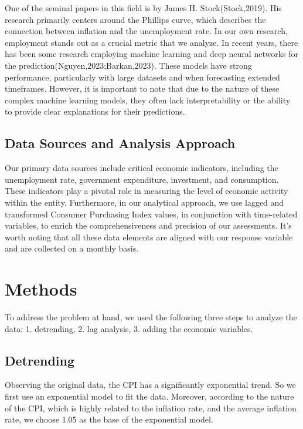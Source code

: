 \documentclass[
  man,floatsintext,
  man]{apa6}
\begin{document}
One of the seminal papers in this field is by James H. Stock(Stock,2019). His research primarily centers around the Phillips curve, which describes the connection between inflation and the unemployment rate. In our own research, employment stands out as a crucial metric that we analyze.
In recent years, there has been some research employing machine learning and deep neural networks for the prediction(Nguyen,2023;Barkan,2023). These models have strong performance, particularly with large datasets and when forecasting extended timeframes. However, it is important to note that due to the nature of these complex machine learning models, they often lack interpretability or the ability to provide clear explanations for their predictions.

\hypertarget{data-sources-and-analysis-approach}{%
\subsection{Data Sources and Analysis Approach}\label{data-sources-and-analysis-approach}}

Our primary data sources include critical economic indicators, including the unemployment rate, government expenditure, investment, and consumption. These indicators play a pivotal role in measuring the level of economic activity within the entity. Furthermore, in our analytical approach, we use lagged and transformed Consumer Purchasing Index values, in conjunction with time-related variables, to enrich the comprehensiveness and precision of our assessments. It's worth noting that all these data elements are aligned with our response variable and are collected on a monthly basis.

\hypertarget{methods}{%
\section{Methods}\label{methods}}

To address the problem at hand, we used the following three steps to analyze the data: 1. detrending, 2. lag analysis, 3. adding the economic variables.

\hypertarget{detrending}{%
\subsection{Detrending}\label{detrending}}

Observing the original data, the CPI has a significantly exponential trend. So we first use an exponential model to fit the data.
Moreover, according to the nature of the CPI, which is highly related to the inflation rate, and the average inflation rate, we choose 1.05 as the base of the exponential model.
\end{document}
